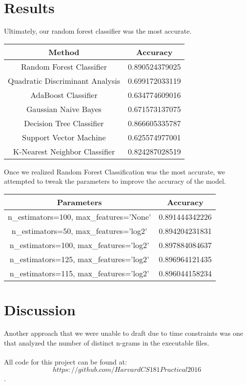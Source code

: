\documentclass{article}
\begin{document}
\section{Results}
Ultimately, our random forest classifier was the most accurate. 
\begin{table}[ht]
\centering 
\begin{tabular}{c c } 
\hline 
Method & Accuracy\\ [0.5ex] 
\hline 
Random Forest Classifier & 0.890524379025 \\ 
Quadratic Discriminant Analysis & 0.699172033119\\
AdaBoost Classifier & 0.634774609016\\
Gaussian Naive Bayes & 0.671573137075\\
Decision Tree Classifier & 0.866605335787\\
Support Vector Machine & 0.625574977001\\
K-Nearest Neighbor Classifier & 0.824287028519\\ [1ex] 
\hline 
\end{tabular}
\label{table:nonlin} 
\end{table}
Once we realized Random Forest Classification was the most accurate, we attempted to tweak the parameters to improve the accuracy of the model. 
\begin{table}[ht]
\centering 
\begin{tabular}{c c } 
\hline 
Parameters & Accuracy\\ [0.5ex] 
\hline 
n\_estimators=100, max\_features='None' & 0.891444342226\\ 
n\_estimators=50, max\_features='log2' & 0.894204231831\\
n\_estimators=100, max\_features='log2' & 0.897884084637\\
n\_estimators=125, max\_features='log2' & 0.896964121435\\
n\_estimators=115, max\_features='log2' & 0.896044158234\\ [1ex] 
\hline 
\end{tabular}
\label{table:nonlin} 
\end{table}

\section{Discussion}
Another approach that we were unable to draft due to time constraints was one that analyzed the number of distinct n-grams in the executable files.\\\\
All code for this project can be found at: $$https://github.com/HarvardCS181Practical2016$$.
\end{document}
